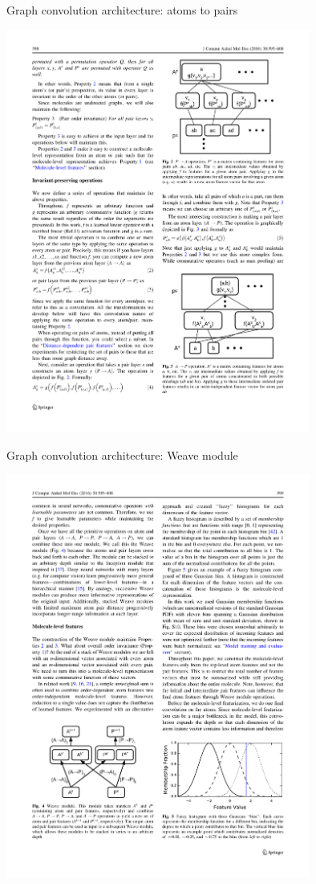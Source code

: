 \documentclass[xetex,compress]{beamer}
\begin{document}
\begin{frame}{Graph convolution architecture: atoms to pairs}
  \begin{center}
    \includegraphics[width=0.75\textwidth]{./figures/gc_fig3.pdf}
  \end{center}
\end{frame}

\begin{frame}{Graph convolution architecture: Weave module}
  \begin{center}
    \includegraphics[width=0.75\textwidth]{./figures/gc_fig4.pdf}
  \end{center}
\end{frame}
\end{document}

